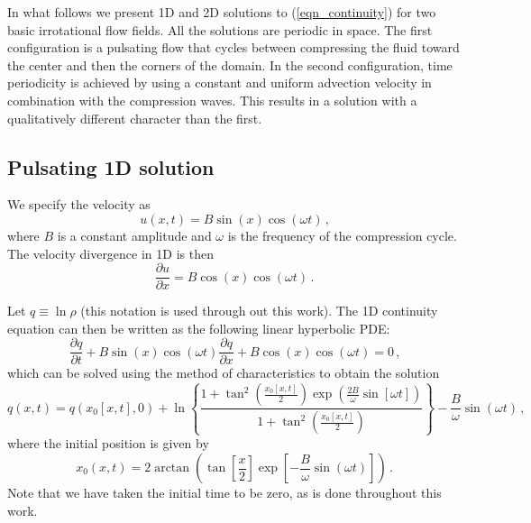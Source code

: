 \documentclass[11pt]{book}
\begin{document}
In what follows we present 1D and 2D solutions to (\ref{eqn_continuity}) for two basic irrotational flow fields.  All the solutions are periodic in space.  The first configuration is a pulsating flow that cycles between compressing the fluid toward the center and then the corners of the domain.  In the second configuration, time periodicity is achieved by using a constant and uniform advection velocity in combination with the compression waves.  This results in a solution with a qualitatively different character than the first.

\subsection{Pulsating 1D solution}
\label{soln_1d}

We specify the velocity as
\begin{equation}
\label{eqn_velocity1d}
u(x,t)  = B \sin(x) \cos(\omega t) \,\mbox{,}
\end{equation}
where $B$ is a constant amplitude and $\omega$ is the frequency of the compression cycle. The velocity divergence in 1D is then
\begin{equation}
\label{eqn_pdesource1d}
\frac{\partial u}{\partial x} = B \cos(x) \cos(\omega t) \,\mbox{.}
\end{equation}

Let $q \equiv \ln \rho$ (this notation is used through out this work).  The 1D continuity equation can then be written as the following linear hyperbolic PDE:
\begin{equation}
\label{eqn_cont1d}
\frac{\partial q}{\partial t} + B \sin(x) \cos(\omega t) \frac{\partial q}{\partial x} + B \cos(x) \cos(\omega t) = 0 \,\mbox{,}
\end{equation}
which can be solved using the method of characteristics to obtain the solution
\begin{equation}
\label{eqn_1dsoln}
q(x,t) = q(x_0[x,t],0) + \ln \left\{ \frac{ 1 + \tan^2\left(\frac{x_0[x,t]}{2}\right) \exp\left(\frac{2B}{\omega}\sin[\omega t]\right) }{ 1 + \tan^2\left(\frac{x_0[x,t]}{2}\right) } \right\} - \frac{B}{\omega} \sin(\omega t) \,\mbox{,}
\end{equation}
where the initial position is given by
\begin{equation}
\label{eqn_initialposition1d}
x_0(x,t) = 2 \arctan\left( \tan\left[\frac{x}{2}\right] \exp\left[-\frac{B}{\omega}\sin(\omega t)\right] \right) \,\mbox{.}
\end{equation}
Note that we have taken the initial time to be zero, as is done throughout this work.
\end{document}
